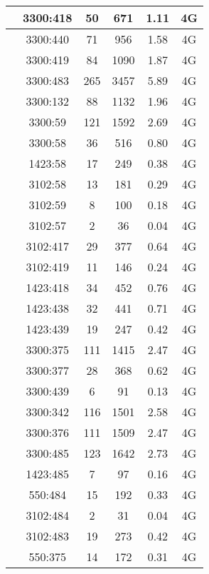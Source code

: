 \begin{longtable*}{|c|c|c|c|c|c|}
 &3300:418&50&671&1.11&4G\\\hline
{} &3300:440&71&956&1.58&4G\\\hline
{} &3300:419&84&1090&1.87&4G\\\hline
{} &3300:483&265&3457&5.89&4G\\\hline
{} &3300:132&88&1132&1.96&4G\\\hline
{} &3300:59&121&1592&2.69&4G\\\hline
{} &3300:58&36&516&0.80&4G\\\hline
{} &1423:58&17&249&0.38&4G\\\hline
{} &3102:58&13&181&0.29&4G\\\hline
{} &3102:59&8&100&0.18&4G\\\hline
{} &3102:57&2&36&0.04&4G\\\hline
{} &3102:417&29&377&0.64&4G\\\hline
{} &3102:419&11&146&0.24&4G\\\hline
{} &1423:418&34&452&0.76&4G\\\hline
{} &1423:438&32&441&0.71&4G\\\hline
{} &1423:439&19&247&0.42&4G\\\hline
{} &3300:375&111&1415&2.47&4G\\\hline
{} &3300:377&28&368&0.62&4G\\\hline
{} &3300:439&6&91&0.13&4G\\\hline
{} &3300:342&116&1501&2.58&4G\\\hline
{} &3300:376&111&1509&2.47&4G\\\hline
{} &3300:485&123&1642&2.73&4G\\\hline
{} &1423:485&7&97&0.16&4G\\\hline
{} &550:484&15&192&0.33&4G\\\hline
{} &3102:484&2&31&0.04&4G\\\hline
{} &3102:483&19&273&0.42&4G\\\hline
{} &550:375&14&172&0.31&4G\\\hline

\end{longtable*}
